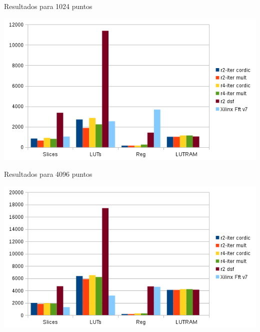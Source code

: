 \begin{frame}{Resultados para 1024 puntos}

	  \begin{center}
		  \includegraphics[scale=0.72]{./figures/sizecomp1024.png}\\
		  
		\end{center}
\end{frame}

\begin{frame}{Resultados para 4096 puntos}
		\begin{center}
		  \includegraphics[scale=0.72]{./figures/sizecomp4096.png}\\
		\end{center}
\end{frame}

